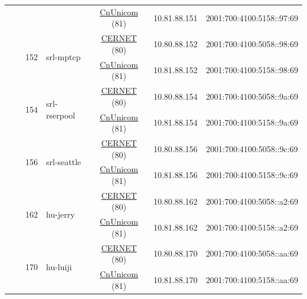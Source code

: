 \begin{small}
\begin{center}
\begin{longtable}{|c|c|c|c|c|c|c|c|}
  &  &  &  & \multicolumn{2}{|c|}{\tiny{\href{http://www.chinaunicom.com}{CnUnicom} (81)}} & \tiny{10.81.88.151} & \tiny{2001:700:4100:5158::97:69} \\* \cline{3-3}\cline{4-4}\cline{5-5}\cline{6-6}\cline{7-7}\cline{8-8}
  &  & \multirow{2}{*}{\tiny{152}} & \multicolumn{1}{|l|}{\multirow{2}{*}{\tiny{srl-mptcp}}} & \multicolumn{2}{|c|}{\tiny{\href{http://www.cernet.edu.cn}{CERNET} (80)}} & \tiny{10.80.88.152} & \tiny{2001:700:4100:5058::98:69} \\* \cline{5-5}\cline{6-6}\cline{7-7}\cline{8-8}
  &  &  &  & \multicolumn{2}{|c|}{\tiny{\href{http://www.chinaunicom.com}{CnUnicom} (81)}} & \tiny{10.81.88.152} & \tiny{2001:700:4100:5158::98:69} \\* \cline{3-3}\cline{4-4}\cline{5-5}\cline{6-6}\cline{7-7}\cline{8-8}
  &  & \multirow{2}{*}{\tiny{154}} & \multicolumn{1}{|l|}{\multirow{2}{*}{\tiny{srl-rserpool}}} & \multicolumn{2}{|c|}{\tiny{\href{http://www.cernet.edu.cn}{CERNET} (80)}} & \tiny{10.80.88.154} & \tiny{2001:700:4100:5058::9a:69} \\* \cline{5-5}\cline{6-6}\cline{7-7}\cline{8-8}
  &  &  &  & \multicolumn{2}{|c|}{\tiny{\href{http://www.chinaunicom.com}{CnUnicom} (81)}} & \tiny{10.81.88.154} & \tiny{2001:700:4100:5158::9a:69} \\* \cline{3-3}\cline{4-4}\cline{5-5}\cline{6-6}\cline{7-7}\cline{8-8}
  &  & \multirow{2}{*}{\tiny{156}} & \multicolumn{1}{|l|}{\multirow{2}{*}{\tiny{srl-seattle}}} & \multicolumn{2}{|c|}{\tiny{\href{http://www.cernet.edu.cn}{CERNET} (80)}} & \tiny{10.80.88.156} & \tiny{2001:700:4100:5058::9c:69} \\* \cline{5-5}\cline{6-6}\cline{7-7}\cline{8-8}
  &  &  &  & \multicolumn{2}{|c|}{\tiny{\href{http://www.chinaunicom.com}{CnUnicom} (81)}} & \tiny{10.81.88.156} & \tiny{2001:700:4100:5158::9c:69} \\* \cline{3-3}\cline{4-4}\cline{5-5}\cline{6-6}\cline{7-7}\cline{8-8}
  &  & \multirow{2}{*}{\tiny{162}} & \multicolumn{1}{|l|}{\multirow{2}{*}{\tiny{hu-jerry}}} & \multicolumn{2}{|c|}{\tiny{\href{http://www.cernet.edu.cn}{CERNET} (80)}} & \tiny{10.80.88.162} & \tiny{2001:700:4100:5058::a2:69} \\* \cline{5-5}\cline{6-6}\cline{7-7}\cline{8-8}
  &  &  &  & \multicolumn{2}{|c|}{\tiny{\href{http://www.chinaunicom.com}{CnUnicom} (81)}} & \tiny{10.81.88.162} & \tiny{2001:700:4100:5158::a2:69} \\* \cline{3-3}\cline{4-4}\cline{5-5}\cline{6-6}\cline{7-7}\cline{8-8}
  &  & \multirow{2}{*}{\tiny{170}} & \multicolumn{1}{|l|}{\multirow{2}{*}{\tiny{hu-luiji}}} & \multicolumn{2}{|c|}{\tiny{\href{http://www.cernet.edu.cn}{CERNET} (80)}} & \tiny{10.80.88.170} & \tiny{2001:700:4100:5058::aa:69} \\* \cline{5-5}\cline{6-6}\cline{7-7}\cline{8-8}
  &  &  &  & \multicolumn{2}{|c|}{\tiny{\href{http://www.chinaunicom.com}{CnUnicom} (81)}} & \tiny{10.81.88.170} & \tiny{2001:700:4100:5158::aa:69} \\ \hline
\end{longtable}
\end{center}
\end{small}
